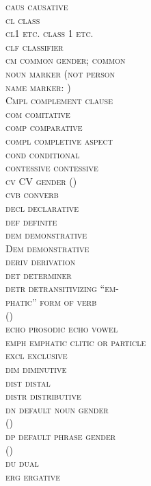 \documentclass[output=collectionpaper]{langsci/langscibook}
\begin{document}
\begin{multicols}{2}
\begin{tabbing}
\scshape caus	\>	causative	\\
\scshape cl	\>	class	\\
\scshape cl1 \normalfont etc.	\>	class 1 etc.	\\
\scshape clf	\>	classifier	\\
\scshape cm	\>	common gender; common\\ \> noun marker (not person \\ \>  name marker: )\\
\normalfont Cmpl	\>	complement clause	\\
\scshape com	\>	comitative	\\
\scshape comp	\>	comparative	\\
\scshape compl	\>	completive aspect	\\
\scshape cond	\>	conditional	\\
\scshape contessive	\>	contessive	\\
\scshape cv	\>	CV gender ()	\\
\scshape cvb	\>	converb	\\
\scshape decl	\>	declarative	\\
\scshape def	\>	definite	\\
\scshape dem	\>	demonstrative	\\
\normalfont Dem	\>	demonstrative	\\
\scshape deriv	\>	derivation	\\
\scshape det	\>	determiner	\\
\scshape detr	\>	detransitivizing ``em-\\ \>phatic'' form of verb \\ \> ()	\\
\scshape echo	\>	prosodic echo vowel	\\
\scshape emph	\>	emphatic clitic or particle	\\
\scshape excl	\>	exclusive	\\
\scshape dim	\>	diminutive	\\
\scshape dist	\>	distal	\\
\scshape distr	\>	distributive	\\
\scshape dn	\>	default noun gender \\ \> ()	\\
\scshape dp	\>	default phrase gender \\ \> ()	\\
\scshape du	\>	dual	\\
\scshape erg	\>	ergative	\\

\end{tabbing}
\end{multicols}
\end{document}
